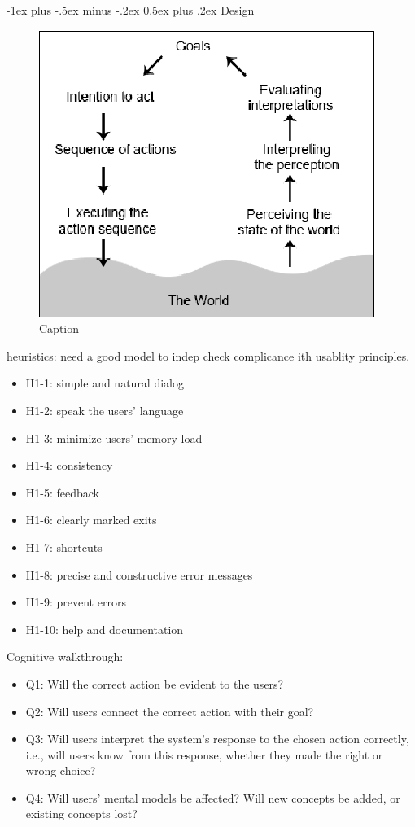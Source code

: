 \documentclass[10pt,landscape]{article}
\makeatletter
\renewcommand{\section}{\@startsection{section}{1}{0mm}%
                                {-1ex plus -.5ex minus -.2ex}%
                                {0.5ex plus .2ex}%
                                {\normalfont\large\bfseries}}
\theoremstyle{definition}
\makeatother
\begin{document}
\begin{multicols}{3}
\section{Design}
\begin{figure}[H]
    \centering
    \includegraphics[width=0.8\linewidth]{norman.png}
    \caption{Caption}
    \label{fig:my_label}
\end{figure}
heuristics: need a good model to indep check complicance ith usablity principles. 
\begin{itemize}[noitemsep,nolistsep]
\item H1-1: simple and natural dialog
\item H1-2: speak the users’ language
\item H1-3: minimize users’ memory load
\item H1-4: consistency
\item H1-5: feedback
\item H1-6: clearly marked exits
\item H1-7: shortcuts
\item H1-8: precise and constructive error messages
\item H1-9: prevent errors
\item H1-10: help and documentation
\end{itemize}
Cognitive walkthrough: 
\begin{itemize} [noitemsep,nolistsep]
    \item Q1: Will the correct action be evident to the users?
\item Q2: Will users connect the correct action with their goal?
\item Q3: Will users interpret the system’s response to the chosen action
correctly, i.e., will users know from this response, whether they
made the right or wrong choice?
\item Q4: Will users’ mental models be affected? Will new concepts be
added, or existing concepts lost?
\end{itemize}



\end{multicols}
\end{document}
